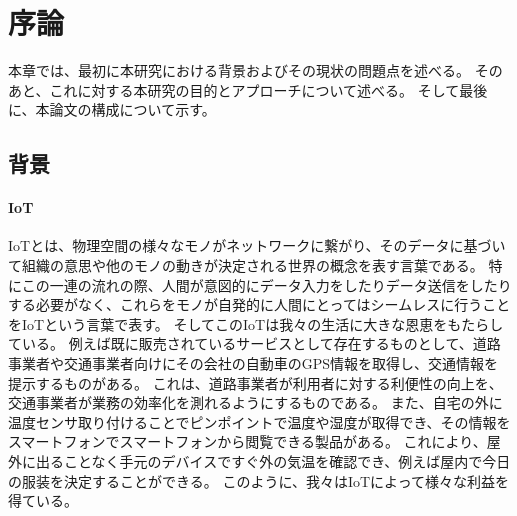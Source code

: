 
\renewcommand{\part}{Contents}
\renewcommand{\prechaptername}{第 }
\renewcommand{\postchaptername}{ 章}

\chapter{序論}
 
本章では、最初に本研究における背景およびその現状の問題点を述べる。
そのあと、これに対する本研究の目的とアプローチについて述べる。
そして最後に、本論文の構成について示す。

\section{背景}
\subsubsection{IoT}
IoTとは、物理空間の様々なモノがネットワークに繋がり、そのデータに基づいて組織の意思や他のモノの動きが決定される世界の概念を表す言葉である。
特にこの一連の流れの際、人間が意図的にデータ入力をしたりデータ送信をしたりする必要がなく、これらをモノが自発的に人間にとってはシームレスに行うことをIoTという言葉で表す。
そしてこのIoTは我々の生活に大きな恩恵をもたらしている。
例えば既に販売されているサービスとして存在するものとして、道路事業者や交通事業者向けにその会社の自動車のGPS情報を取得し、交通情報を提示するものがある。\cite{hitachi_traffic}
これは、道路事業者が利用者に対する利便性の向上を、交通事業者が業務の効率化を測れるようにするものである。
また、自宅の外に温度センサ取り付けることでピンポイントで温度や湿度が取得でき、その情報をスマートフォンでスマートフォンから閲覧できる製品がある。\cite{therometer}
これにより、屋外に出ることなく手元のデバイスですぐ外の気温を確認でき、例えば屋内で今日の服装を決定することができる。
このように、我々はIoTによって様々な利益を得ている。

